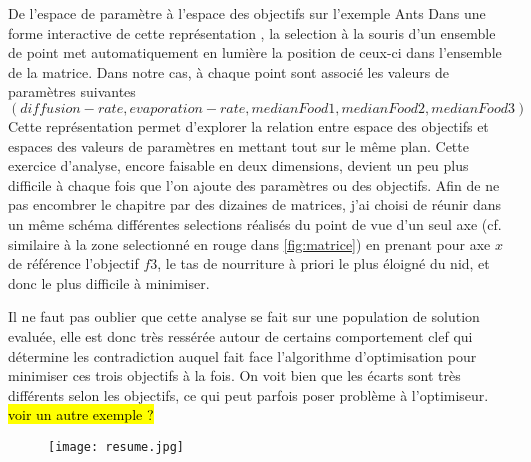 \begin{testiv}{De l'espace de paramètre à l'espace des objectifs sur l'exemple Ants }{}
Dans une forme interactive de cette représentation , la selection à la souris d'un ensemble de point met automatiquement en lumière la position de ceux-ci dans l'ensemble de la matrice. Dans notre cas, à chaque point sont associé les valeurs de paramètres suivantes $(diffusion-rate,evaporation-rate, medianFood1, medianFood2, medianFood3)$ Cette représentation permet d'explorer la relation entre espace des objectifs et espaces des valeurs de paramètres en mettant tout sur le même plan. Cette exercice d'analyse, encore faisable en deux dimensions, devient un peu plus difficile à chaque fois que l'on ajoute des paramètres ou des objectifs. Afin de ne pas encombrer le chapitre par des dizaines de matrices, j'ai choisi de réunir dans un même schéma différentes selections réalisés du point de vue d'un seul axe (cf. similaire à la zone selectionné en rouge dans \ref{fig:matrice}) en prenant pour axe $x$ de référence l'objectif $f3$, le tas de nourriture à priori le plus éloigné du nid, et donc le plus difficile à minimiser.

Il ne faut pas oublier que cette analyse se fait sur une population de solution evaluée, elle est donc très ressérée autour de certains comportement clef qui détermine les contradiction auquel fait face l'algorithme d'optimisation pour minimiser ces trois objectifs à la fois. On voit bien que les écarts sont très différents selon les objectifs, ce qui peut parfois poser problème à l'optimiseur. \hl{voir un autre exemple ?}

\begin{figure}[H]
	 \centering
	 	\texttt{[image: resume.jpg]}
\end{figure}


\end{testiv}
